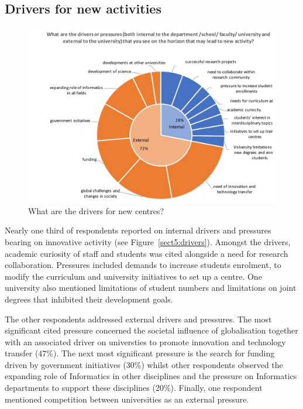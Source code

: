 \subsection{Drivers for new activities}

\begin{figure}[h]
\centering
\includegraphics[width = \linewidth]{charts/5g.jpg}
\caption{What are the drivers for new centres?}
\label{sect3:drivers}
\end{figure}
                                                                                                                    
Nearly one third of respondents reported on internal drivers and pressures bearing on innovative activity (see Figure~\ref{sect5:drivers}). Amongst the drivers, academic curiosity of staff and students was cited alongside a need for research collaboration. Pressures included demands to increase students enrolment, to modify the curriculum and university initiatives to set up a centre. One university also mentioned limitations of student numbers and limitations on joint degrees that inhibited their development goals.

The other respondents addressed external drivers and pressures. The most significant cited pressure concerned the societal influence of globalisation together with an associated driver on universties to promote innovation and  technology transfer (47\%).  The next most significant pressure is the search for funding driven by government initiatives (30\%) whilst other respondents observed the expanding role of Informatics in other disciplines and the pressure on Informatics departments to support these disciplines (20\%). Finally, one respondent mentioned competition between universities as an external pressure.

